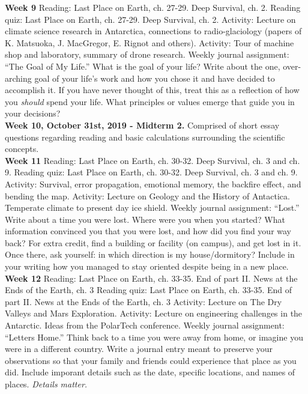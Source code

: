 \documentclass[10pt]{article}
\begin{document}
\begin{outline}[enumerate]
\1 \textbf{Week 9}
\2 Reading: Last Place on Earth, ch. 27-29.  Deep Survival, ch. 2.
\2 Reading quiz:  Last Place on Earth, ch. 27-29.  Deep Survival, ch. 2.
\2 Activity: Lecture on climate science research in Antarctica, connections to radio-glaciology (papers of K. Matsuoka, J. MacGregor, E. Rignot and others).
\2 Activity: Tour of machine shop and laboratory, summary of drone research.
\2 Weekly journal assignment: ``The Goal of My Life.'' What is the goal of your life?  Write about the one, over-arching goal of your life's work and how you chose it and have decided to accomplish it.  If you have never thought of this, treat this as a reflection of how you \textit{should} spend your life.  What principles or values emerge that guide you in your decisions? \\
\1 \textbf{Week 10, October 31st, 2019 - Midterm 2.} Comprised of short essay questions regarding reading and basic calculations surrounding the scientific concepts. \\
\1 \textbf{Week 11}
\2 Reading: Last Place on Earth, ch. 30-32. Deep Survival, ch. 3 and ch. 9.
\2 Reading quiz: Last Place on Earth, ch. 30-32. Deep Survival, ch. 3 and ch. 9.
\2 Activity: Survival, error propagation, emotional memory, the backfire effect, and bending the map.
\2 Activity: Lecture on Geology and the History of Antactica.  Temperate climate to present day ice shield.
\2 Weekly journal assignment: ``Lost.'' Write about a time you were lost.  Where were you when you started?  What information convinced you that you were lost, and how did you find your way back?  For extra credit, find a building or facility (on campus), and get lost in it.  Once there, ask yourself: in which direction is my house/dormitory?  Include in your writing how you managed to stay oriented despite being in a new place. \\
\1 \textbf{Week 12}
\2 Reading: Last Place on Earth, ch. 33-35. End of part II.  News at the Ends of the Earth, ch. 3
\2 Reading quiz: Last Place on Earth, ch. 33-35. End of part II.  News at the Ends of the Earth, ch. 3
\2 Activity: Lecture on The Dry Valleys and Mars Exploration.
\2 Activity: Lecture on engineering challenges in the Antarctic.  Ideas from the PolarTech conference.
\2 Weekly journal assignment: ``Letters Home.'' Think back to a time you were away from home, or imagine you were in a different country.  Write a journal entry meant to preserve your observations so that your family and friends could experience that place as you did.  Include imporant details such as the date, specific locations, and names of places.  \textit{Details matter.} \\

\end{outline}
\end{document}
